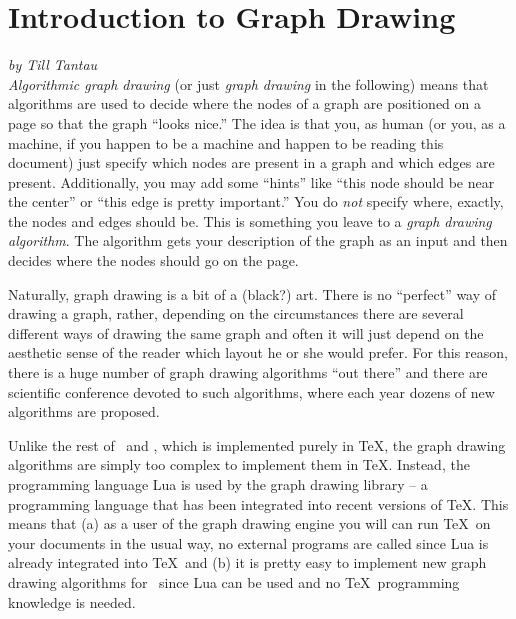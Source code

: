 %
%
%


\section{Introduction to Graph Drawing}

\emph{by Till Tantau}
\\[1em]

\emph{Algorithmic graph drawing} (or just \emph{graph drawing} in the
following) means that algorithms are used to decide where the nodes of
a graph are positioned on a page so that the graph ``looks nice.'' The
idea is that you, as human (or you, as a machine, if you happen to be
a machine and happen to be reading this document) just specify which
nodes are present in a graph and which edges are
present. Additionally, you may add some ``hints'' like ``this node
should be near the center'' or ``this edge is pretty important.'' You
do \emph{not} specify where, exactly, the nodes and edges should
be. This is something you leave to a \emph{graph drawing
  algorithm}. The algorithm gets your description of the graph as an
input and then decides where the nodes should go on the page.

Naturally, graph drawing is a bit of a (black?) art. There is no
``perfect'' way of drawing a graph, rather, depending on the
circumstances there are several different ways of drawing the same
graph and often it will just depend on the aesthetic sense of the
reader which layout he or she would prefer. For this reason, there is
a huge number of graph drawing algorithms ``out there'' and there are
scientific conference devoted to such algorithms, where each
year dozens of new algorithms are proposed.

Unlike the rest of \pgfname\ and \tikzname, which is implemented
purely in \TeX, the graph drawing algorithms are simply too complex to
implement them in \TeX. Instead, the programming language Lua is used
by the graph drawing library -- a programming language that has been
integrated into recent versions of \TeX. This means that (a) as a user
of the graph drawing engine you will can run \TeX\ on your documents
in the usual way, no external programs are called since Lua is already
integrated into \TeX\ and (b) it is pretty easy to implement new graph
drawing algorithms for \tikzname\ since Lua can be used and no \TeX\
programming knowledge is needed. 

